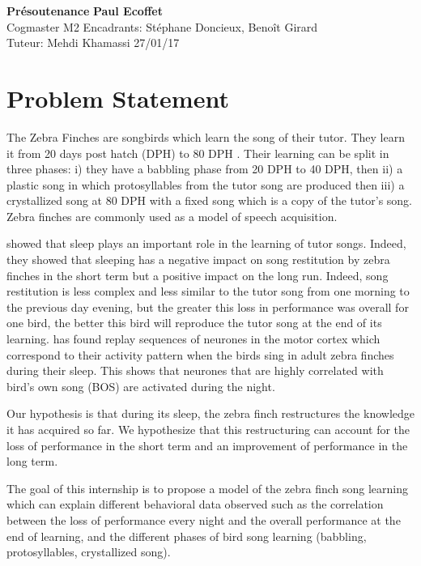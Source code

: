 \documentclass[a4paper, 11pt]{article}
\begin{document}
\noindent
\large\textbf{Présoutenance} \hfill \textbf{Paul Ecoffet} \\
\normalsize Cogmaster M2 \hfill Encadrants: Stéphane Doncieux, Benoît Girard \\
Tuteur: Mehdi Khamassi \hfill 27/01/17

\section*{Problem Statement}

The Zebra Finches are songbirds which learn the song of their tutor. They learn
it from 20 days post hatch (DPH) to 80 DPH \parencite{liu_juvenile_2004}. Their
learning can be split in three phases: i) they have a babbling phase from 20 DPH
to 40 DPH, then ii) a plastic song in which protosyllables from the tutor song
are produced then iii) a crystallized song at 80 DPH with a fixed song which is
a copy of the tutor's song. Zebra finches are commonly used
as a model of speech acquisition.

\textcite{deregnaucourt_how_2005} showed that sleep plays an important role in
the learning of tutor songs. Indeed, they showed that sleeping has a negative
impact on song restitution by zebra finches in the short term but a positive
impact on the long run. Indeed, song restitution is less complex and less
similar to the tutor song from one morning to the previous day evening, but the
greater this loss in performance was overall for one bird, the better this bird
will reproduce the tutor song at the end of its learning.
\textcite{dave_song_2000} has found replay sequences of neurones in the motor
cortex which correspond to their activity pattern when the birds sing in adult
zebra finches during their sleep. This shows that neurones that are highly
correlated with bird's own song (BOS) are activated during the night.

Our hypothesis is that during its sleep, the zebra finch restructures the
knowledge it has acquired so far. We hypothesize that this restructuring can
account for the loss of performance in the short term and an improvement of
performance in the long term.

The goal of this internship is to propose a model of the zebra finch song
learning which can explain different behavioral data observed such as the
correlation between the loss of performance every night and the overall
performance at the end of learning, and the different phases of bird song
learning (babbling, protosyllables, crystallized song).
\end{document}
